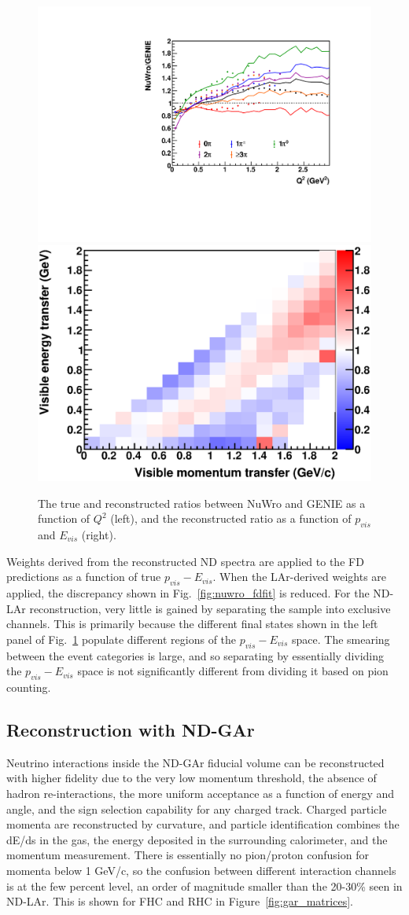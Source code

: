 \documentclass[11pt]{article}
\begin{document}
\begin{figure}[h]
\centering
\includegraphics[width=0.45\columnwidth]{graphics/LAr_TrueRecoRatios_Q2.pdf}
\includegraphics[width=0.45\columnwidth]{graphics/ratio_q0q3_all.eps}
\caption{The true and reconstructed ratios between NuWro and GENIE as a function of $Q^{2}$ (left), and the reconstructed ratio as a function of $p_{vis}$ and $E_{vis}$ (right).}
\label{fig:lar_ratios}
\end{figure}

Weights derived from the reconstructed ND spectra are applied to the FD predictions as a function of true $p_{vis}-E_{vis}$. When the LAr-derived weights are applied, the discrepancy shown in Fig.~\ref{fig:nuwro_fdfit} is reduced. For the ND-LAr reconstruction, very little is gained by separating the sample into exclusive channels. This is primarily because the different final states shown in the left panel of Fig.~\ref{fig:lar_ratios} populate different regions of the $p_{vis}-E_{vis}$ space. The smearing between the event categories is large, and so separating by essentially dividing the $p_{vis}-E_{vis}$ space is not significantly different from dividing it based on pion counting.

\subsection{Reconstruction with ND-GAr}

Neutrino interactions inside the ND-GAr fiducial volume can be reconstructed with higher fidelity due to the very low momentum threshold, the absence of hadron re-interactions, the more uniform acceptance as a function of energy and angle, and the sign selection capability for any charged track. Charged particle momenta are reconstructed by curvature, and particle identification combines the dE/ds in the gas, the energy deposited in the surrounding calorimeter, and the momentum measurement. There is essentially no pion/proton confusion for momenta below 1 GeV/c, so the confusion between different interaction channels is at the few percent level, an order of magnitude smaller than the 20-30\% seen in ND-LAr. This is shown for FHC and RHC in Figure~\ref{fig:gar_matrices}.
\end{document}
